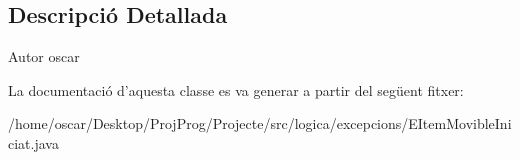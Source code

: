\subsection{Descripció Detallada}
\begin{DoxyAuthor}{Autor}
oscar 
\end{DoxyAuthor}


La documentació d'aquesta classe es va generar a partir del següent fitxer\+:\begin{DoxyCompactItemize}
\item 
/home/oscar/\+Desktop/\+Proj\+Prog/\+Projecte/src/logica/excepcions/E\+Item\+Movible\+Iniciat.\+java\end{DoxyCompactItemize}
